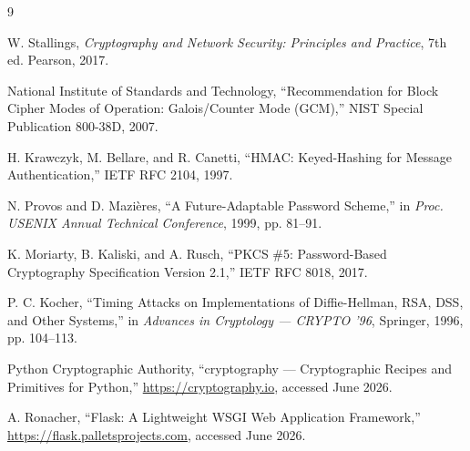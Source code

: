 \documentclass[conference]{IEEEtran}
\begin{document}
\begin{thebibliography}{9}

W. Stallings,
\textit{Cryptography and Network Security: Principles and Practice}, 7th ed.
Pearson, 2017.

National Institute of Standards and Technology,
``Recommendation for Block Cipher Modes of Operation: Galois/Counter Mode (GCM),''
NIST Special Publication 800-38D, 2007.

H. Krawczyk, M. Bellare, and R. Canetti,
``HMAC: Keyed-Hashing for Message Authentication,''
IETF RFC 2104, 1997.

N. Provos and D. Mazi\`eres,
``A Future-Adaptable Password Scheme,''
in \textit{Proc. USENIX Annual Technical Conference}, 1999, pp. 81--91.

K. Moriarty, B. Kaliski, and A. Rusch,
``PKCS \#5: Password-Based Cryptography Specification Version 2.1,''
IETF RFC 8018, 2017.

P. C. Kocher,
``Timing Attacks on Implementations of Diffie-Hellman, RSA, DSS, and Other Systems,''
in \textit{Advances in Cryptology --- CRYPTO '96}, Springer, 1996, pp. 104--113.

Python Cryptographic Authority,
``cryptography --- Cryptographic Recipes and Primitives for Python,''
\url{https://cryptography.io}, accessed June 2026.

A. Ronacher,
``Flask: A Lightweight WSGI Web Application Framework,''
\url{https://flask.palletsprojects.com}, accessed June 2026.

\end{thebibliography}
\end{document}
